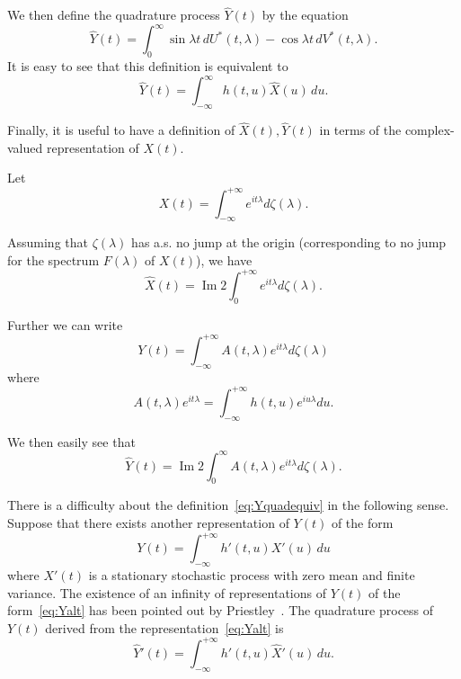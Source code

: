 \documentclass{article}
\begin{document}
We then define the quadrature process $\hat{Y}(t)$ by the equation
\begin{equation}
\hat{Y}(t) = \int_0^{\infty} \sin \lambda t\, dU^*(t, \lambda) - \cos \lambda t\, dV^*(t, \lambda).
\label{eq:Yquad}
\end{equation}
It is easy to see that this definition is equivalent to
\begin{equation}
\hat{Y}(t) = \int_{-\infty}^{\infty} h(t, u) \hat{X}(u)\, du.
\label{eq:Yquadequiv}
\end{equation}

Finally, it is useful to have a definition of $\hat{X}(t), \hat{Y}(t)$ in terms of the complex-valued representation of $X(t)$.

Let
\begin{equation}
X(t) = \int_{-\infty}^{+\infty} e^{i t \lambda} d\zeta(\lambda).
\label{eq:Xcomplex}
\end{equation}

Assuming that $\zeta(\lambda)$ has a.s. no jump at the origin (corresponding to no jump for the spectrum $F(\lambda)$ of $X(t)$), we have
\begin{equation}
\hat{X}(t) = \operatorname{Im} 2 \int_0^{+\infty} e^{i t \lambda} d\zeta(\lambda).
\label{eq:Xhatcomplex}
\end{equation}

Further we can write
\begin{equation}
Y(t) = \int_{-\infty}^{+\infty} A(t, \lambda) e^{i t \lambda} d\zeta(\lambda)
\label{eq:Ycomplex}
\end{equation}
where
\begin{equation}
A(t, \lambda) e^{i t \lambda} = \int_{-\infty}^{+\infty} h(t, u) e^{i u \lambda} du.
\label{eq:Adef}
\end{equation}

We then easily see that
\begin{equation}
\hat{Y}(t) = \operatorname{Im} 2 \int_0^{\infty} A(t, \lambda) e^{i t \lambda} d\zeta(\lambda).
\label{eq:Yhatcomplex}
\end{equation}

There is a difficulty about the definition~\eqref{eq:Yquadequiv} in the following sense. Suppose that there exists another representation of $Y(t)$ of the form
\begin{equation}
Y(t) = \int_{-\infty}^{+\infty} h'(t, u) X'(u)\, du
\label{eq:Yalt}
\end{equation}
where $X'(t)$ is a stationary stochastic process with zero mean and finite variance. The existence of an infinity of representations of $Y(t)$ of the form~\eqref{eq:Yalt} has been pointed out by Priestley~\cite[ p. 205]{priestley}. The quadrature process of $Y(t)$ derived from the representation~\eqref{eq:Yalt} is
\begin{equation}
\hat{Y}'(t) = \int_{-\infty}^{+\infty} h'(t, u) \hat{X}'(u)\, du.
\label{eq:Yquadprime}
\end{equation}
\end{document}
